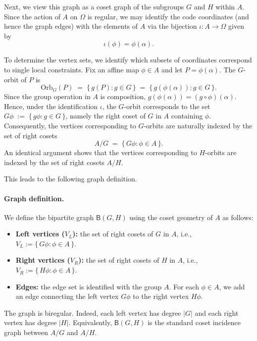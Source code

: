 \documentclass[11pt]{article}
\theoremstyle{plain}
\theoremstyle{definition}
\begin{document}
Next, we view this graph as a coset graph of the subgroups $G$ and $H$ within $A$. Since the action of $A$ on $\Omega$ is regular, we may identify the code coordinates (and hence the graph edges) with the elements of $A$ via the bijection $\iota:A\to\Omega$ given by
\begin{equation}
\label{eq:iota_map}
\iota(\phi) = \phi(\alpha).
\end{equation}

To determine the vertex sets, we identify which subsets of coordinates correspond to single local constraints. Fix an affine map $\phi\in A$ and let $P=\phi(\alpha)$. The $G$-orbit of $P$ is
\[
\mathrm{Orb}_G(P) \;=\; \{\, g(P) : g\in G \,\}
\;=\;
\{\, g(\phi(\alpha)) : g\in G \,\}.
\]
Since the group operation in $A$ is composition, $g(\phi(\alpha))=(g\circ\phi)(\alpha)$. Hence, under the identification $\iota$, the $G$-orbit corresponds to the set
$
G\phi \;:=\; \{\, g\phi : g\in G \,\}$, 
namely the right coset of $G$ in $A$ containing $\phi$. Consequently, the vertices corresponding to $G$-orbits are naturally indexed by the set of right cosets
\[
A/G \;=\; \{\,G\phi : \phi\in A\,\}.
\]
An identical argument shows that the vertices corresponding to $H$-orbits are indexed by the set of right cosets $A/H$.

This leads to the following graph definition.

\paragraph{Graph definition.}
We define the bipartite graph $\mathsf{B}(G,H)$ using the coset geometry of $A$ as follows:
\begin{itemize}
  \item \textbf{Left vertices ($V_L$):} the set of right cosets of $G$ in $A$, i.e.,
  $
  V_L := \{\,G\phi : \phi\in A\,\}.$
  
  \item \textbf{Right vertices ($V_R$):} the set of right cosets of $H$ in $A$, i.e.,
  $
  V_R := \{\,H\phi : \phi\in A\,\}.
  $
  \item \textbf{Edges:} the edge set is identified with the group $A$. For each $\phi\in A$, we add an edge connecting the left vertex $G\phi$ to the right vertex $H\phi$.
\end{itemize}

The graph is biregular. Indeed, each left vertex has degree $|G|$ and each right vertex has degree $|H|$. Equivalently, $\mathsf{B}(G,H)$ is the standard coset incidence graph between $A/G$ and $A/H$.
\end{document}
